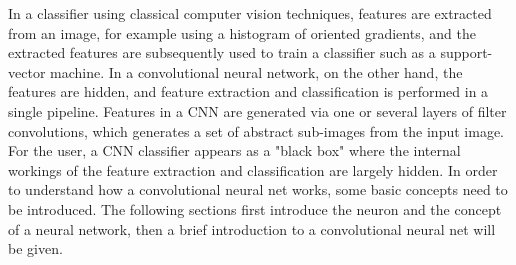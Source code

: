 In a classifier using classical computer vision techniques, features are extracted from an image, for example using a histogram of oriented gradients, and the extracted features are subsequently used to train a classifier such as a support-vector machine. In a convolutional neural network, on the other hand, the features are hidden, and feature extraction and classification is performed in a single pipeline. Features in a CNN are generated via one or several layers of filter convolutions, which generates a set of abstract sub-images from the input image. For the user, a CNN classifier appears as a "black box" where the internal workings of the feature extraction and classification are largely hidden. In order to understand how a convolutional neural net works, some basic concepts need to be introduced. The following sections first introduce the neuron and the concept of a neural network, then a brief introduction to a convolutional neural net will be given.
